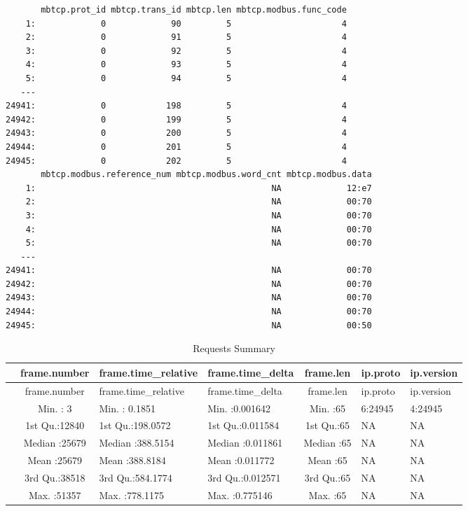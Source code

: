 \documentclass[12pt,]{article}
\begin{document}
\begin{verbatim}
       mbtcp.prot_id mbtcp.trans_id mbtcp.len mbtcp.modbus.func_code
    1:             0             90         5                      4
    2:             0             91         5                      4
    3:             0             92         5                      4
    4:             0             93         5                      4
    5:             0             94         5                      4
   ---                                                              
24941:             0            198         5                      4
24942:             0            199         5                      4
24943:             0            200         5                      4
24944:             0            201         5                      4
24945:             0            202         5                      4
       mbtcp.modbus.reference_num mbtcp.modbus.word_cnt mbtcp.modbus.data
    1:                                               NA             12:e7
    2:                                               NA             00:70
    3:                                               NA             00:70
    4:                                               NA             00:70
    5:                                               NA             00:70
   ---                                                                   
24941:                                               NA             00:70
24942:                                               NA             00:70
24943:                                               NA             00:70
24944:                                               NA             00:70
24945:                                               NA             00:50
\end{verbatim}

\begin{longtable}[c]{@{}lcllcll@{}}
\caption{Requests Summary}\tabularnewline
\toprule
& frame.number & frame.time\_relative & frame.time\_delta & frame.len &
ip.proto & ip.version\tabularnewline
\midrule
\endfirsthead
\toprule
& frame.number & frame.time\_relative & frame.time\_delta & frame.len &
ip.proto & ip.version\tabularnewline
\midrule
\endhead
& Min. : 3 & Min. : 0.1851 & Min. :0.001642 & Min. :65 & 6:24945 &
4:24945\tabularnewline
& 1st Qu.:12840 & 1st Qu.:198.0572 & 1st Qu.:0.011584 & 1st Qu.:65 & NA
& NA\tabularnewline
& Median :25679 & Median :388.5154 & Median :0.011861 & Median :65 & NA
& NA\tabularnewline
& Mean :25679 & Mean :388.8184 & Mean :0.011772 & Mean :65 & NA &
NA\tabularnewline
& 3rd Qu.:38518 & 3rd Qu.:584.1774 & 3rd Qu.:0.012571 & 3rd Qu.:65 & NA
& NA\tabularnewline
& Max. :51357 & Max. :778.1175 & Max. :0.775146 & Max. :65 & NA &
NA\tabularnewline
\bottomrule
\end{longtable}
\end{document}
